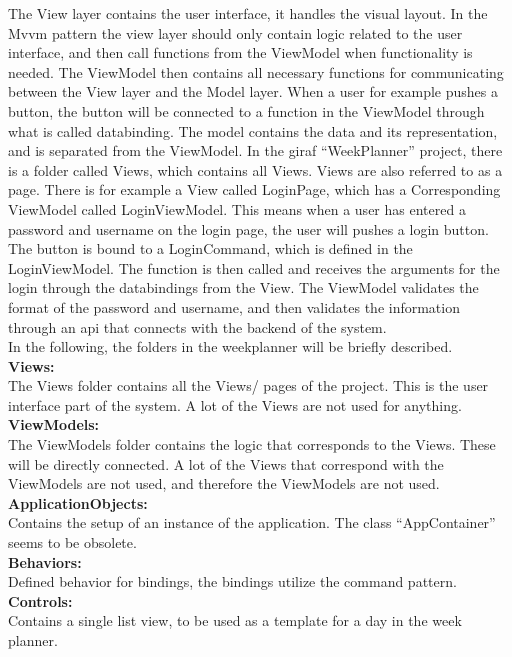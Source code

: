 The View layer contains the user interface, it handles the visual layout. In the \gls{Mvvm} pattern the view layer should only contain logic related to the user interface, and then call functions from the ViewModel when functionality is needed. The ViewModel then contains all necessary functions for communicating between the View layer and the Model layer. When a user for example pushes a button, the button will be connected to a function in the ViewModel through what is called databinding. 
The model contains the data and its representation, and is separated from the ViewModel. 
In the \gls{giraf} “WeekPlanner” project, there is a folder called Views, which contains all Views. Views are also referred to as a page. There is for example a View called LoginPage, which has a Corresponding ViewModel called LoginViewModel. This means when a user has entered a password and username on the login page, the user will pushes a login button. The button is bound to a LoginCommand, which is defined in the LoginViewModel. The function is then called and receives the arguments for the login through the databindings from the View. The ViewModel validates the format of the password and username, and then validates the information through an api that connects with the backend of the system. 
\\
In the following, the folders in the weekplanner will be briefly described.
\\
\textbf{Views:}\\
The Views folder contains all the Views/ pages of the project. This is the user interface part of the system. A lot of the Views are not used for anything. 
\\
\textbf{ViewModels:}\\
The ViewModels folder contains the logic that corresponds to the Views. These will be directly connected. A lot of the Views that correspond with the ViewModels are not used, and therefore the ViewModels are not used.
\\
\textbf{ApplicationObjects:}\\
Contains the setup of an instance of the application. The class “AppContainer” seems to be obsolete. 
\\
\textbf{Behaviors: }\\
Defined behavior for bindings, the bindings utilize the command pattern. 
\\
\textbf{Controls:}\\
Contains a single list view, to be used as a template for a day in the week planner. 
\\
